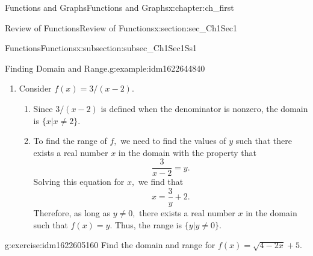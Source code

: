 \documentclass[oneside,10pt,]{book}
\numberwithin{equation}{section}
\begin{document}
\begin{chapterptx}{Functions and Graphs}{}{Functions and Graphs}{}{}{x:chapter:ch_first}
\begin{sectionptx}{Review of Functions}{}{Review of Functions}{}{}{x:section:sec_Ch1Sec1}
\begin{subsectionptx}{Functions}{}{Functions}{}{}{x:subsection:subsec_Ch1Sec1Ss1}
\begin{example}{Finding Domain and Range.}{g:example:idm1622644840}
\begin{enumerate}
\begin{enumerate}
\begin{equation*}
\sqrt{3x+2}-1=y.
\end{equation*}
Solving this equation for \(x,\) we see that \(x\) must solve the equation%
\begin{equation*}
\sqrt{3x+2}=y+1.
\end{equation*}
Since \(y\geq-1,\) such an \(x\) could exist. Squaring both sides of this equation, we have%
\begin{equation*}
3x+2=(y+1)^2.
\end{equation*}
Therefore, we need%
\begin{equation*}
3x=(y+1)^2-2,
\end{equation*}
which implies%
\begin{equation*}
x=\frac{1}{3}(y+1)^2-\frac{2}{3}.
\end{equation*}
We just need to verify that \(x\) is in the domain of \(f.\) Since the domain of \(f\) consists of all real numbers greater than or equal to \(-2/3,\) and%
\begin{equation*}
\frac{1}{3}(y+1)^2-\frac{2}{3}\geq -\frac{2}{3},
\end{equation*}
there does exist an \(x\) in the domain of \(f.\) We conclude that the range of \(f\) is \(\{y|y\geq-1\}.\)%
\end{enumerate}
\item{}Consider \(f(x)=3/(x-2).\)%
\begin{enumerate}
\item{}Since \(3/(x-2)\) is defined when the denominator is nonzero, the domain is \(\{x|x \neq 2\}.\)%
\item{}To find the range of \(f,\) we need to find the values of \(y\) such that there exists a real number \(x\) in the domain with the property that%
\begin{equation*}
\frac{3}{x-2}=y.
\end{equation*}
Solving this equation for \(x,\) we find that%
\begin{equation*}
x=\frac{3}{y}+2.
\end{equation*}
Therefore, as long as \(y\neq 0,\) there exists a real number \(x\) in the domain such that \(f(x)=y.\) Thus, the range is \(\{y|y \neq 0\}.\)%
\end{enumerate}
%
\end{enumerate}
\end{example}
\begin{inlineexercise}{}{g:exercise:idm1622605160}%
Find the domain and range for \(f(x)=\sqrt{4-2x}+5.\)%
\par\smallskip%

\end{inlineexercise}
\end{subsectionptx}
\end{sectionptx}
\end{chapterptx}
\end{document}
